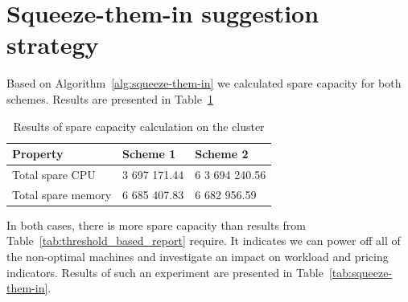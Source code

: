 \documentclass[]{final_report}
\begin{document}
\section{Squeeze-them-in suggestion strategy}

Based on Algorithm~\ref{alg:squeeze-them-in} we calculated spare capacity for both schemes. Results are presented in Table~\ref{tab:squeeze-them-in-capacity}

\begin{table}[h]
\begin{center}
    \begin{tabular}{| l | l | l |}
    \hline
    \textbf{Property} & \textbf{Scheme 1} & \textbf{Scheme 2} \\
    \hline
    Total spare CPU & 3 697 171.44 & 6 3 694 240.56  \\
    \hline
    Total spare memory & 6 685 407.83 & 6 682 956.59 \\
    \hline
    \end{tabular}
\end{center}
\caption{Results of spare capacity calculation on the cluster}
\label{tab:squeeze-them-in-capacity}
\end{table}

In both cases, there is more spare capacity than results from Table~\ref{tab:threshold_based_report} require. It indicates we can power off all of the non-optimal machines and investigate an impact on workload and pricing indicators. Results of such an experiment are presented in Table~\ref{tab:squeeze-them-in}. 
\end{document}
